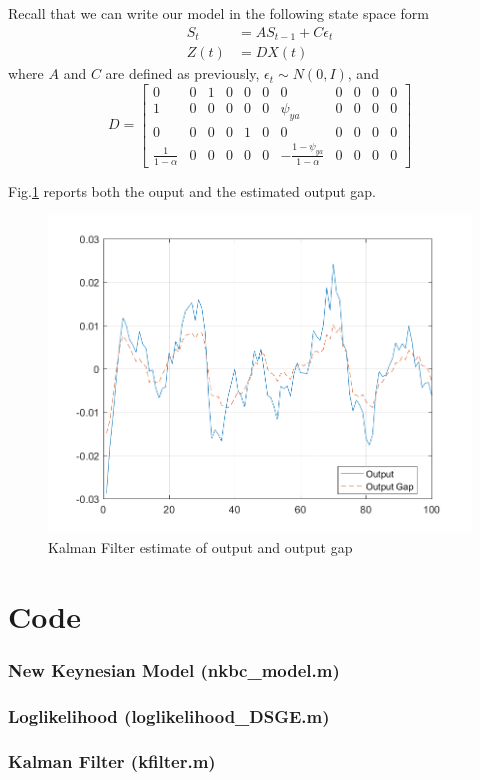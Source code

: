 \documentclass[12pt]{article}
\theoremstyle{definition}
\newcommand{\bra}[1]{\left[#1\right]}
\newcommand{\mat}[1]{\begin{matrix}#1\end{matrix}}
\newcommand{\bmat}[1]{\bra{\mat{#1}}}
\begin{document}
Recall that we can write our model in the following state space form
\begin{align*}
S_t &= A S_{t-1} + C \epsilon_t\\
Z(t) &= DX(t)
\end{align*}
where $A$ and $C$ are defined as previously, $\epsilon_t\sim N(0,I)$, and
\[
D = \bmat{0& 0&1 &0& 0& 0& 0& 0& 0& 0& 0\\
	1& 0& 0& 0& 0& 0& \psi_{ya}& 0& 0& 0& 0\\
	0& 0& 0& 0& 1& 0& 0& 0& 0& 0& 0\\
	\frac{1}{1-\alpha}& 0& 0& 0& 0& 0& -\frac{1-\psi_{ya}}{1-\alpha}& 0& 0& 0& 0}
\]

Fig.\ref{fig:kalman} reports both the ouput and the estimated output gap.
\begin{figure}[H]
	\centering
	\includegraphics[width=\linewidth]{kalman}
	\caption{Kalman Filter estimate of output and output gap}
	\label{fig:kalman}
\end{figure}


\section*{Code}

\subsubsection*{New Keynesian Model (nkbc\_model.m)}

\subsubsection*{Loglikelihood (loglikelihood\_DSGE.m)}

\subsubsection*{Kalman Filter (kfilter.m)}

\end{document}
